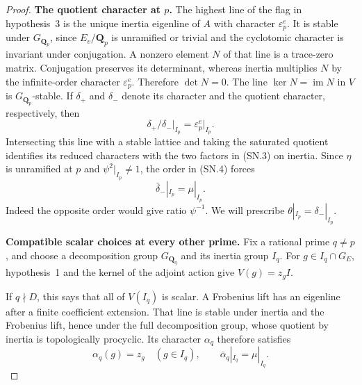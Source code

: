 \documentclass[11pt,a4paper]{article}
\theoremstyle{definition}
\renewcommand{\paragraph}[1]{\par\smallskip\noindent\textbf{#1}\quad\ignorespaces}
\begin{document}
\begin{proof}
\paragraph{The quotient character at $p$.}
The highest line of the flag in hypothesis~3 is the unique inertia
eigenline of $A$ with character $\varepsilon_p^e$.
It is stable under $G_{\mathbf Q_p}$, since $E_v/\mathbf Q_p$ is
unramified or trivial and the cyclotomic character is invariant
under conjugation.  A nonzero element $N$ of that line is a
trace-zero matrix.  Conjugation preserves its determinant,
whereas inertia multiplies $N$ by the infinite-order character
$\varepsilon_p^e$.  Therefore $\det N=0$.
The line $\ker N=\operatorname{im}N$ in $V$ is
$G_{\mathbf Q_p}$-stable.  If $\delta_+$ and $\delta_-$ denote
its character and the quotient character, respectively, then
\[
            \delta_+/\delta_-\big|_{I_p}
                        =\varepsilon_p^e\big|_{I_p}.     \tag{SN.4}
\]
Intersecting this line with a stable lattice and taking the
saturated quotient identifies its reduced characters with the
two factors in (SN.3) on inertia.  Since $\eta$ is unramified
at $p$ and $\psi^2|_{I_p}\ne1$, the order in (SN.4) forces
\[
                   \bar\delta_-|_{I_p}=\mu|_{I_p}.        \tag{SN.5}
\]
Indeed the opposite order would give ratio $\psi^{-1}$.
We will prescribe $\theta|_{I_p}=\delta_-|_{I_p}$.

\paragraph{Compatible scalar choices at every other prime.}
Fix a rational prime $q\ne p$, and choose a decomposition group
$G_{\mathbf Q_q}$ and its inertia group $I_q$.
For $g\in I_q\cap G_E$, hypothesis~1 and the kernel of the
adjoint action give $V(g)=z_g I$.

If $q\nmid D$, this says that all of $V(I_q)$ is scalar.
A Frobenius lift has an eigenline after a finite coefficient
extension.  That line is stable under inertia and the Frobenius
lift, hence under the full decomposition group, whose quotient
by inertia is topologically procyclic.  Its character
$\alpha_q$ therefore satisfies
\[
               \alpha_q(g)=z_g\quad(g\in I_q),
               \qquad \bar\alpha_q|_{I_q}=\mu|_{I_q}.     \tag{SN.6}
\]


\end{proof}
\end{document}
